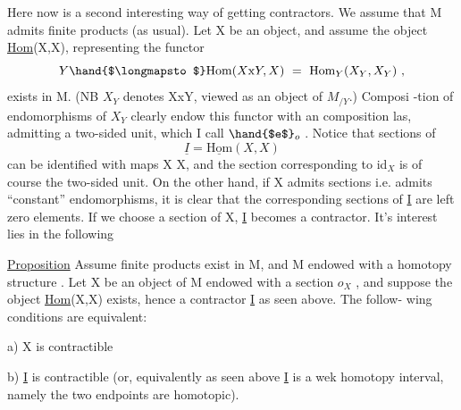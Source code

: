 Here now is a second interesting way of getting contractors.  We
assume that M admits finite products (as usual).  Let X be an object,  and
assume the object \uline{Hom}(X,X),  representing the functor
\[ Y \hand{$\longmapsto$} \mathrm{Hom}(X\mathrm{x}Y,X) \ = \ \mathrm{Hom}_{Y}(X_{Y},X_{Y}) \text{ ,} \]
exists in M.  (NB  $X_{Y}$  denotes XxY, viewed as an object of $M_{/Y}$.)  Composi
-tion of endomorphisms of $X_{Y}$ clearly endow this functor with an  composition
las,  admitting a two-sided unit, which I call $\hand{$e$}_{o}$ .   Notice that
sections of 
\[ \underline{I} = \underline{\mathrm{Hom}}(X,X) \]
can be identified with maps X \hand{$\rightarrow$} X,  and the section corresponding to id$_{X}$
is of course the two-sided unit.  On the other hand,  if X admits sections
i.e. admits ``constant'' endomorphisms,  it is clear that the corresponding
sections of \underline{I} are  left zero elements.  If we choose  a section
of X,  \underline{I}  becomes a contractor.  It's interest lies in the following

\uline{Proposition}  Assume  finite products exist in M,  and M endowed with
a homotopy structure  .
 Let X be an object of M endowed with a section $o_{X}$ ,  and suppose the
object \uline{Hom}(X,X) exists,  hence a contractor \underline{I} as seen above.  The follow-%
wing  conditions are equivalent:

a)  X is contractible

b)  \underline{I} is contractible (or,  equivalently as seen above\hand{,} \underline{I} is a wek
homotopy interval, namely the two endpoints are homotopic).

